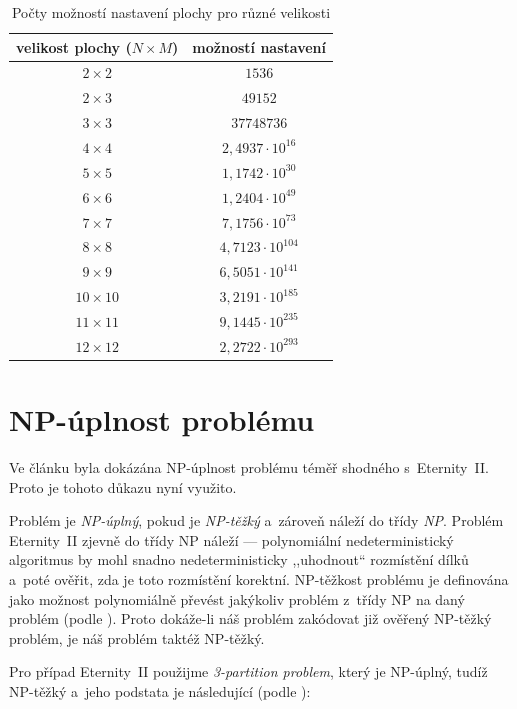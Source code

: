 \documentclass[11pt, titlepage]{report}
\begin{document}
\begin{table}[ht]
\centering
\begin{tabular}{|c|c|}
\hline
\textbf{velikost plochy ($N \times M$)} & \textbf{možností nastavení} \\ \hline
$2 \times 2$ & $1 536$ \\ \hline
$2 \times 3$ & $49 152$ \\ \hline
$3 \times 3$ & $37 748 736$ \\ \hline
$4 \times 4$ & $2,493 7 \cdot 10^{16}$ \\ \hline
$5 \times 5$ & $1,174 2 \cdot 10^{30}$ \\ \hline
$6 \times 6$ & $1,240 4 \cdot 10^{49}$ \\ \hline
$7 \times 7$ & $7,175 6 \cdot 10^{73}$ \\ \hline
$8 \times 8$ & $4,712 3 \cdot 10^{104}$ \\ \hline
$9 \times 9$ & $6,505 1 \cdot 10^{141}$ \\ \hline
$10 \times 10$ & $3,219 1 \cdot 10^{185}$ \\ \hline
$11 \times 11$ & $9,144 5 \cdot 10^{235}$ \\ \hline
$12 \times 12$ & $2,272 2 \cdot 10^{293}$ \\
\hline
\end{tabular}
\caption{Počty možností nastavení plochy pro různé velikosti}
\label{tabulka-moznosti}
\end{table}


\section{NP-úplnost problému}
\label{sec:problem-np}

Ve článku \cite{np-dukaz} byla dokázána NP-úplnost problému téměř shodného s~Eternity~II. Proto je tohoto důkazu nyní využito.

Problém je \emph{NP-úplný}, pokud je \emph{NP-těžký} a~zároveň náleží do třídy \emph{NP}. Problém Eternity~II zjevně do třídy NP náleží --- polynomiální nedeterministický algoritmus by mohl snadno nedeterministicky ,,uhodnout`` rozmístění dílků a~poté ověřit, zda je toto rozmístění korektní. NP-těžkost problému je definována jako možnost polynomiálně převést jakýkoliv problém z~třídy NP na daný problém (podle \cite[str.~261]{np-skripta}). Proto dokáže-li náš problém zakódovat již ověřený NP-těžký problém, je náš problém taktéž NP-těžký.

Pro případ Eternity~II použijme \emph{3-partition problem}, který je NP-úplný, tudíž NP-těžký a~jeho podstata je následující (podle \cite{np-3par-wiki}):
\end{document}

